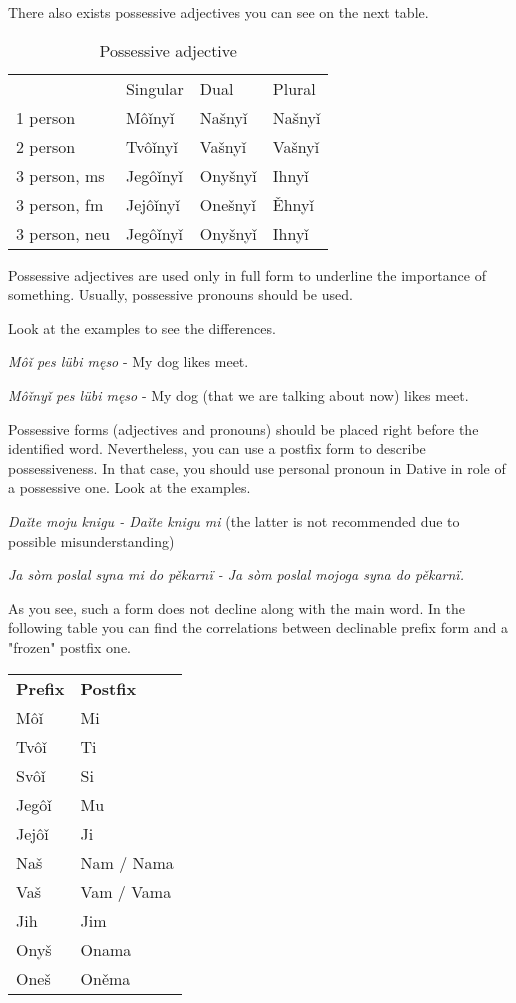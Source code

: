 There also exists possessive adjectives you can see on the next table.

\begin{table}
	\caption{Possessive adjective}
	\begin{tabular}{llll}
		& Singular & Dual & Plural \\
		1 person & Môǐnyǐ & Našnyǐ & Našnyǐ \\
		2 person & Tvôǐnyǐ & Vašnyǐ & Vašnyǐ \\
		3 person, ms & Jegôǐnyǐ & Onyšnyǐ & Ihnyǐ \\
		3 person, fm & Jejôǐnyǐ & Onešnyǐ & Ěhnyǐ \\
		3 person, neu & Jegôǐnyǐ & Onyšnyǐ & Ihnyǐ
	\end{tabular}
\end{table}

Possessive adjectives are used only in full form to underline the importance of something. Usually, possessive pronouns should be used.

Look at the examples to see the differences.

\textit{Môǐ pes lübi męso} - My dog likes meet.

\textit{Môǐnyǐ pes lübi męso} - My dog (that we are talking about now) likes meet.

Possessive forms (adjectives and pronouns) should be placed right before the identified word. Nevertheless, you can use a postfix form to describe possessiveness. In that case, you should use personal pronoun in Dative in role of a possessive one. Look at the examples.

\textit{Daǐte moju knigu - Daǐte knigu mi} (the latter is not recommended due to possible misunderstanding)

\textit{Ja  sòm poslal syna mi do pěkarnï - Ja sòm poslal mojoga syna do pěkarnï.}

As you see, such a form does not decline along with the main word. In the following table you can find the correlations between declinable prefix form and a "frozen" postfix one.

\begin{table}
	\begin{tabular}{ll}
		\textbf{Prefix} & \textbf{Postfix} \\
		Môǐ & Mi \\
		Tvôǐ & Ti \\
		Svôǐ & Si \\
		Jegôǐ & Mu \\
		Jejôǐ & Ji \\
		Naš & Nam / Nama \\
		Vaš & Vam / Vama \\
		Jih & Jim \\
		Onyš & Onama \\
		Oneš & Oněma \\
	\end{tabular}
\end{table}

